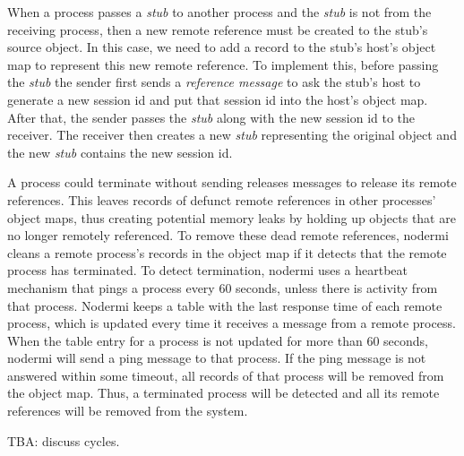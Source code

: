 When a process passes a \emph{stub} to another process and the \emph{stub}
is not from the receiving process, then a new remote reference must be created
to the stub's source object.  In this case, we need to add a record to
the stub's host's object map to represent this new remote reference.
To implement this, before passing the \emph{stub} the sender first
sends a \emph{reference message} to ask the stub's host to generate a
new session id and put that session id into the host's object map.  After
that, the sender passes the \emph{stub} along with the new session id to
the receiver.  The receiver then creates a new \emph{stub} representing
the original object and the new \emph{stub} contains the new session id.

A process could terminate without sending releases messages to release
its remote references.  This leaves records of defunct remote references
in other processes' object maps, thus creating potential memory leaks by
holding up objects that are no longer remotely referenced.  To remove
these dead remote references, nodermi cleans a remote process's records
in the object map if it detects that the remote process has terminated.
To detect termination, nodermi uses a heartbeat mechanism that pings
a process every 60 seconds, unless there is activity from that process.
Nodermi keeps a table with the last response time of each remote process,
which is updated every time it receives a message from a
remote process.  When the table entry for a process is not updated for
more than 60 seconds, nodermi will send a ping message to that process.
If the ping message is not answered within some timeout, all records of that
process will be removed from the object map.  Thus, a terminated process
will be detected and all its remote references will be removed from the system.

TBA: discuss cycles.





